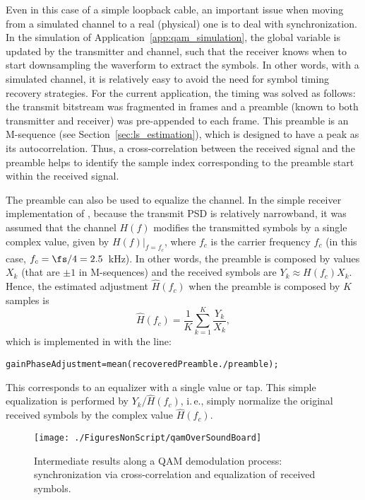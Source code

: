 Even in this case of a simple loopback cable, an important issue when moving from a simulated channel to a real (physical) one is to deal with synchronization. In the simulation of Application~\ref{app:qam_simulation}, the global variable  is updated by the transmitter and channel, such that the receiver knows when to start downsampling the waverform to extract the symbols. In other words, with a simulated channel, it is relatively easy to avoid the need for symbol timing recovery strategies. For the current application, the timing was solved as follows: the transmit bitstream was fragmented in frames and a preamble (known to both transmitter and receiver) was pre-appended to each frame. This preamble is an M-sequence (see Section~\ref{sec:ls_estimation}), which is designed to have a peak as its autocorrelation. Thus, a cross-correlation between the received signal and the preamble helps to identify the sample index corresponding to the preamble start within the received signal.

The preamble can also be used to equalize the channel. In the simple receiver implementation of , because the transmit PSD is relatively narrowband, it was assumed that the channel $H(f)$ modifies the transmitted symbols by a single complex value, given by $H(f)|_{f=f_c}$, where $f_c$ is the carrier frequency $f_c$ (in this case, $f_c=\fs/4=2.5$~kHz). In other words, the preamble is composed by values $X_k$ (that are $\pm 1$ in M-sequences) and the received symbols are $Y_k \approx H(f_c) X_k$. Hence, the estimated adjustment $\hat H(f_c)$ when the preamble is composed by $K$ samples is
\begin{equation}
\hat H(f_c) = \frac{1}{K} \sum_{k=1}^K \frac{Y_k}{X_k},
\end{equation}
which is implemented in  with the line:
\begin{lstlisting}
gainPhaseAdjustment=mean(recoveredPreamble./preamble);
\end{lstlisting}
This corresponds to an equalizer with a single value or tap. This simple equalization is performed by  $Y_k / \hat H(f_c)$, i.\,e., simply normalize the original received symbols by the complex value $\hat H(f_c)$.

\begin{figure}
\centering
\texttt{[image: ./FiguresNonScript/qamOverSoundBoard]}
\caption{Intermediate results along a QAM demodulation process: synchronization via cross-correlation and equalization of received symbols.\label{fig:qamOverSoundBoard}}
\end{figure}

